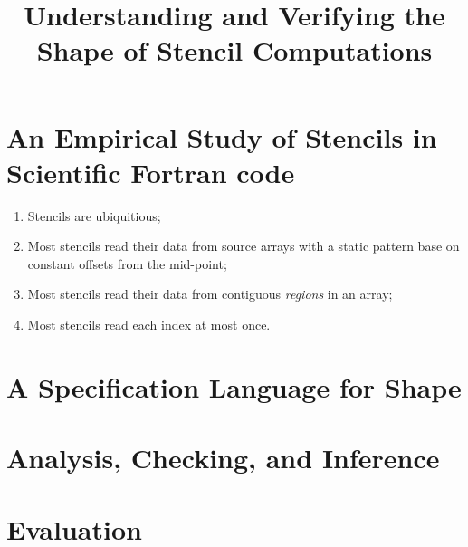 \documentclass[acmlarge,anonymous,review]{acmart}
\title{Understanding and Verifying the Shape of Stencil Computations}
\begin{document}
\maketitle

%

\section{An Empirical Study of Stencils in Scientific Fortran code}

\begin{enumerate}
\item Stencils are ubiquitious;
\item Most stencils read their data from source arrays with a static pattern
base on constant offsets from the mid-point;
\item Most stencils read their data from contiguous \emph{regions} in an array;
\item Most stencils read each index at most once.
\end{enumerate}

\section{A Specification Language for Shape}

\section{Analysis, Checking, and Inference}

\section{Evaluation}



\end{document}
